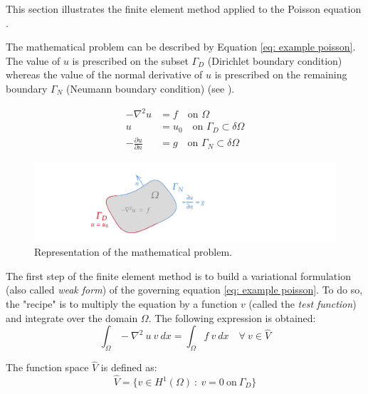 This section illustrates the finite element method applied to the Poisson equation .

The mathematical problem can be described by Equation \ref{eq: example poisson}.
The value of $u$ is prescribed on the subset $\Gamma_D$ (Dirichlet boundary condition) whereas the value of the normal derivative of $u$ is prescribed on the remaining boundary $\Gamma_N$ (Neumann boundary condition) (see ).

\begin{subequations}
    \begin{align}
        -\nabla^2 u &= f \quad \text{on    } \Omega \\
        u &= u_0 \quad \text{on    } \Gamma_D  \subset \delta \Omega \\
        -\frac{\partial u}{\partial n} &= g \quad \text{on    } \Gamma_N  \subset \delta \Omega
    \end{align}
    \label{eq: example poisson}
\end{subequations}


\begin{figure} [h]
    \centering
    \includegraphics[trim=50 0 200 0, clip, width=0.7\linewidth]{Figures/Chapter2/finite_element_problem_sketch.pdf}
    \caption{Representation of the mathematical problem.}
\end{figure}

The first step of the finite element method is to build a variational formulation (also called \textit{weak form}) of the governing equation \ref{eq: example poisson}.
To do so, the "recipe" is to multiply the equation by a function $v$ (called the \textit{test function}) and integrate over the domain $\Omega$.
The following expression is obtained:
\begin{equation}
    \int_{\Omega} -\nabla^2 \ u \ v \ dx = \int_{\Omega} f \ v \ dx \quad \forall \ v \in \hat{V}
    \label{eq: weak form 1}
\end{equation}

The function space $\hat{V}$ is defined as:
\begin{equation}
    \hat{V} = \{ v \in H^1(\Omega) \ : \ v=0 \ \text{on} \ \Gamma_D \}
\end{equation}

